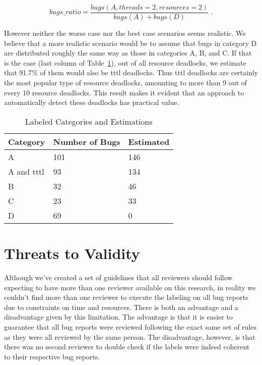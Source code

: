 \begin{equation}\label{eq:worse}
bugs\_ratio = \frac{ bugs(A, threads=2, resources=2) }{ bugs(A) + bugs(D) } \; .
\end{equation}

However neither the worse case nor the best case scenarios seems realistic. We believe that a more realistic scenario would be to assume that bugs in category D are distributed roughly the same way as those in categories A, B, and C. If that is the case (last column of Table~\ref{tab:categ}), out of all resource deadlocks, we estimate that 91.7\% of them would also be \ac{tttl} deadlocks. Thus \ac{tttl} deadlocks are certainly the most popular type of resource deadlocks, amounting to more than 9 out of every 10 resource deadlocks. This result makes it evident that an approach to automatically detect these deadlocks has practical value.

\begin{table}
\begin{center}
\caption{Labeled Categories and Estimations}\label{tab:categ}
\begin{tabular}{|l|l|l|}
\hline
Category & Number of Bugs & Estimated \\
\hline
A & 101 & 146 \\
A and \ac{tttl} & 93 & 134  \\
B & 32 & 46 \\
C & 23 & 33 \\
D & 69 & 0 \\
\hline
\end{tabular}
\end{center}
\end{table}

\section{Threats to Validity}

Although we've created a set of guidelines that all reviewers should follow expecting to have more than one reviewer available on this research,
in reality we couldn't find more than one reviewer to execute the labeling on all bug reports due to constraints on time and resources. There is both an advantage
and a disadvantage given by this limitation. The advantage is that it is easier to guarantee that all bug reports were reviewed following the exact same set of rules
as they were all reviewed by the same person. The disadvantage, however, is that there was no second reviewer to double check if the labels
were indeed coherent to their respective bug reports.

